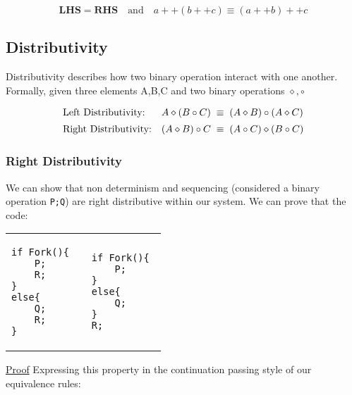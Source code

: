 \documentclass[logo,bsc,singlespacing,parskip]{infthesis}
\begin{document}
\[
\textbf{LHS} = \textbf{RHS} \quad \text{and} \quad a ++ (b ++ c) \equiv (a ++ b) ++ c
\]


\subsection*{Distributivity}
Distributivity describes how two binary operation interact with one another. Formally, given three elements A,B,C and two binary operations $\diamond, \circ $

\[
\begin{array}{l l}
\text{Left Distributivity:} & A \diamond (B \circ C) \;\equiv\; (A \diamond B) \circ (A \diamond C) \\[5pt]
\text{Right Distributivity:} &(A \diamond B) \circ C  \;\equiv\; (A \circ C) \diamond (B \circ C)
\end{array}
\]



\subsubsection*{Right Distributivity}
We can show that non determinism and sequencing (considered a binary operation \texttt{P;Q}) are right distributive within our system. 
We can prove that the code:

\begin{table}[H]
\centering
\begin{tabular}{p{} c p{}}
\begin{lstlisting}
if Fork(){
    P; 
    R;
}
else{ 
    Q; 
    R;
}
\end{lstlisting}
&
&
\begin{lstlisting}
if Fork(){ 
    P;
}
else{
    Q;
}
R;
\end{lstlisting}
\end{tabular}
\end{table}

\vspace{-2em}

\underline{Proof}
Expressing this property in the continuation passing style of our equivalence rules:

\end{document}
